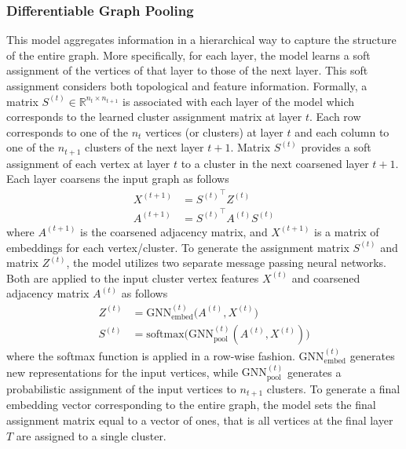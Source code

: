 \documentclass[twoside,11pt]{article}
\begin{document}
\subsubsection{Differentiable Graph Pooling}
This model aggregates information in a hierarchical way to capture the structure of the entire graph.
More specifically, for each layer, the model learns a soft assignment of the vertices of that layer to those of the next layer.
This soft assignment considers both topological and feature information.
Formally, a matrix $S^{(t)} \in \mathbb{R}^{n_t \times n_{t+1}}$ is associated with each layer of the model which corresponds to the learned cluster assignment matrix at layer $t$.
Each row corresponds to one of the $n_t$ vertices (or clusters) at layer $t$ and each column to one of the $n_{t+1}$ clusters of the next layer $t+1$.
Matrix $S^{(t)}$ provides a soft assignment of each vertex at layer $t$ to a cluster in the next coarsened layer $t+1$.
Each layer coarsens the input graph as follows
\begin{equation}
  \begin{split}
    X^{(t+1)} &= {S^{(t)}}^{\!\!\top} Z^{(t)} \\
    A^{(t+1)} &= {S^{(t)}}^{\!\!\top} A^{(t)} S^{(t)}
  \end{split}
\end{equation}
where $A^{(t+1)}$ is the coarsened adjacency matrix, and $X^{(t+1)}$ is a matrix of embeddings for each vertex/cluster.
To generate the assignment matrix $S^{(t)}$ and matrix $Z^{(t)}$, the model utilizes two separate message passing neural networks.
Both are applied to the input cluster vertex features $X^{(t)}$ and coarsened adjacency matrix $A^{(t)}$ as follows
\begin{equation}
    \begin{split}
      Z^{(t)} &= \text{GNN}_{\text{embed}}^{(t)} \big( A^{(t)}, X^{(t)} \big) \\
      S^{(t)} &= \text{softmax} \big( \text{GNN}_{\text{pool}}^{(t)} (A^{(t)}, X^{(t)}) \big)
    \end{split}
\end{equation}
where the softmax function is applied in a row-wise fashion.
$\text{GNN}_{\text{embed}}^{(t)}$ generates new representations for the input vertices, while $\text{GNN}_{\text{pool}}^{(t)}$ generates a probabilistic assignment of the input vertices to $n_{t+1}$ clusters.
To generate a final embedding vector corresponding to the entire graph, the model sets the final assignment matrix equal to a vector of ones, that is all vertices at the final layer $T$ are assigned to a single cluster. 
\end{document}
